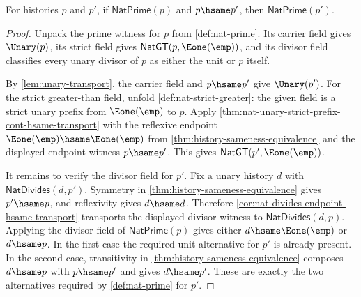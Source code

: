 \begin{theorem}
\label{thm:natprime-hsame-transport}
For histories $p$ and $p'$, if $\mathsf{NatPrime}(p)$ and $p\hsame p'$, then $\mathsf{NatPrime}(p')$.
\end{theorem}
\begin{proof}
Unpack the prime witness for $p$ from \autoref{def:nat-prime}. Its carrier field gives $\Unary(p)$, its strict field gives $\mathsf{NatGT}(p,\Eone(\emp))$, and its divisor field classifies every unary divisor of $p$ as either the unit or $p$ itself.

By \autoref{lem:unary-transport}, the carrier field and $p\hsame p'$ give $\Unary(p')$. For the strict greater-than field, unfold \autoref{def:nat-strict-greater}: the given field is a strict unary prefix from $\Eone(\emp)$ to $p$. Apply \autoref{thm:nat-unary-strict-prefix-cont-hsame-transport} with the reflexive endpoint $\Eone(\emp)\hsame\Eone(\emp)$ from \autoref{thm:history-sameness-equivalence} and the displayed endpoint witness $p\hsame p'$. This gives $\mathsf{NatGT}(p',\Eone(\emp))$.

It remains to verify the divisor field for $p'$. Fix a unary history $d$ with $\mathsf{NatDivides}(d,p')$. Symmetry in \autoref{thm:history-sameness-equivalence} gives $p'\hsame p$, and reflexivity gives $d\hsame d$. Therefore \autoref{cor:nat-divides-endpoint-hsame-transport} transports the displayed divisor witness to $\mathsf{NatDivides}(d,p)$. Applying the divisor field of $\mathsf{NatPrime}(p)$ gives either $d\hsame\Eone(\emp)$ or $d\hsame p$. In the first case the required unit alternative for $p'$ is already present. In the second case, transitivity in \autoref{thm:history-sameness-equivalence} composes $d\hsame p$ with $p\hsame p'$ and gives $d\hsame p'$. These are exactly the two alternatives required by \autoref{def:nat-prime} for $p'$.
\end{proof}
